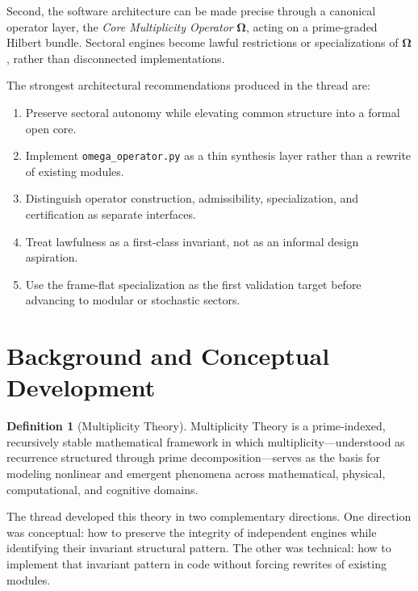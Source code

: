 \documentclass[11pt]{article}
\theoremstyle{plain}
\theoremstyle{definition}
\newtheorem{definition}[theorem]{Definition}
\theoremstyle{remark}
\newcommand{\Om}{\boldsymbol{\Omega}}
\begin{document}
Second, the software architecture can be made precise through a canonical operator layer, the \emph{Core Multiplicity Operator} \(\Om\), acting on a prime-graded Hilbert bundle. Sectoral engines become lawful restrictions or specializations of \(\Om\), rather than disconnected implementations.

The strongest architectural recommendations produced in the thread are:

\begin{enumerate}[label=\textbf{R\arabic*.}]
    \item Preserve sectoral autonomy while elevating common structure into a formal open core.
    \item Implement \texttt{omega\_operator.py} as a thin synthesis layer rather than a rewrite of existing modules.
    \item Distinguish operator construction, admissibility, specialization, and certification as separate interfaces.
    \item Treat lawfulness as a first-class invariant, not as an informal design aspiration.
    \item Use the frame-flat specialization as the first validation target before advancing to modular or stochastic sectors.
\end{enumerate}

\section{Background and Conceptual Development}

\begin{definition}[Multiplicity Theory]
Multiplicity Theory is a prime-indexed, recursively stable mathematical framework in which multiplicity---understood as recurrence structured through prime decomposition---serves as the basis for modeling nonlinear and emergent phenomena across mathematical, physical, computational, and cognitive domains.
\end{definition}

The thread developed this theory in two complementary directions. One direction was conceptual: how to preserve the integrity of independent engines while identifying their invariant structural pattern. The other was technical: how to implement that invariant pattern in code without forcing rewrites of existing modules.
\end{document}
